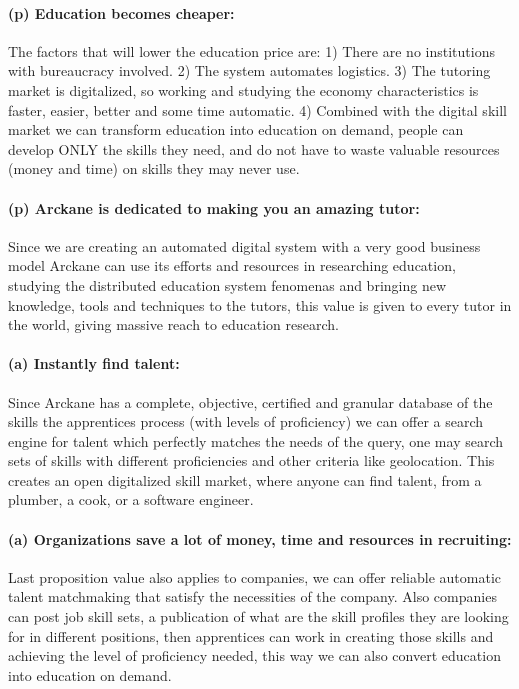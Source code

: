 \paragraph{(p) Education becomes cheaper:} The factors that will lower the education price are: 1) There are no institutions with bureaucracy involved. 2) The system automates logistics. 3) The tutoring market is digitalized, so working and studying the economy characteristics is faster, easier, better and some time automatic. 4) Combined with the digital skill market we can transform education into education on demand, people can develop ONLY the skills they need, and do not have to waste valuable resources (money and time) on skills they may never use.

\paragraph{(p) Arckane is dedicated to making you an amazing tutor:} Since we are creating an automated digital system with a very good business model Arckane can use its efforts and resources in researching education, studying the distributed education system fenomenas and bringing new knowledge, tools and techniques to the tutors, this value is given to every tutor in the world, giving massive reach to education research. 

\paragraph{(a) Instantly find talent:} Since Arckane has a complete, objective, certified and granular database of the skills the apprentices process (with levels of proficiency) we can offer a search engine for talent which perfectly matches the needs of the query, one may search sets of skills with different proficiencies and other criteria like geolocation. This creates an open digitalized skill market, where anyone can find talent, from a plumber, a cook, or a software engineer.

\paragraph{(a) Organizations save a lot of money, time and resources in recruiting:} Last proposition value also applies to companies, we can offer reliable automatic talent matchmaking that satisfy the necessities of the company. Also companies can post job skill sets, a publication of what are the skill profiles they are looking for in different positions, then apprentices can work in creating those skills and achieving the level of proficiency needed, this way we can also convert education into education on demand.

